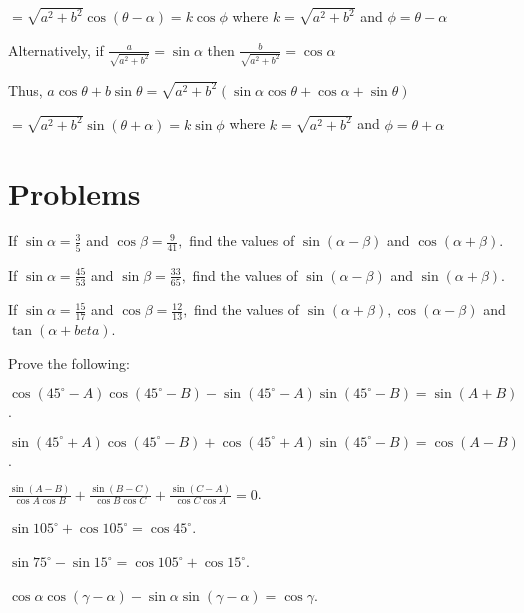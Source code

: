 $= \sqrt{a^2 + b^2}\cos(\theta - \alpha) = k\cos\phi$ where $k = \sqrt{a^2 + b^2}$ and $\phi = \theta - \alpha$

Alternatively, if $\frac{a}{\sqrt{a^2 + b^2}} = \sin\alpha$ then $\frac{b}{\sqrt{a^2 + b^2}} = \cos\alpha$

Thus, $a\cos\theta + b\sin\theta = \sqrt{a^2 + b^2}(\sin\alpha\cos\theta + \cos\alpha + \sin\theta)$

$= \sqrt{a^2 + b^2}\sin(\theta + \alpha) = k\sin\phi$ where $k = \sqrt{a^2+b^2}$ and $\phi = \theta + \alpha$

\section{Problems}
\startitemize[n, 1*broad]
\item If $\sin\alpha = \frac{3}{5}$ and $\cos\beta = \frac{9}{41},$ find the values of $\sin(\alpha - \beta)$ and
   $\cos(\alpha + \beta)$.

\item If $\sin\alpha = \frac{45}{53}$ and $\sin\beta = \frac{33}{65},$ find the values of $\sin(\alpha - \beta)$ and
   $\sin(\alpha + \beta)$.

\item If $\sin\alpha = \frac{15}{17}$ and $\cos\beta = \frac{12}{13},$ find the values of $\sin(\alpha + \beta),
  \cos(\alpha - \beta)$ and $\tan(\alpha + beta)$.
\stopitemize

Prove the following:

\item $\cos(45^{\circ} - A)\cos(45^{\circ} - B) - \sin(45^{\circ} - A)\sin(45^{\circ} - B) = \sin(A + B)$.

\item $\sin(45^{\circ} + A)\cos(45^\circ - B) + \cos(45^{\circ} + A)\sin(45^\circ - B) = \cos(A - B)$.

\item $\frac{\sin(A - B)}{\cos A\cos B} + \frac{\sin(B - C)}{\cos B\cos C} + \frac{\sin(C - A)}{\cos C\cos A} = 0$.

\item $\sin 105^\circ + \cos 105^\circ = \cos 45^\circ$.

\item $\sin 75^\circ - \sin 15^\circ = \cos 105^\circ + \cos 15^\circ$.

\item $\cos\alpha\cos(\gamma - \alpha) - \sin\alpha\sin(\gamma - \alpha) = \cos\gamma$.

